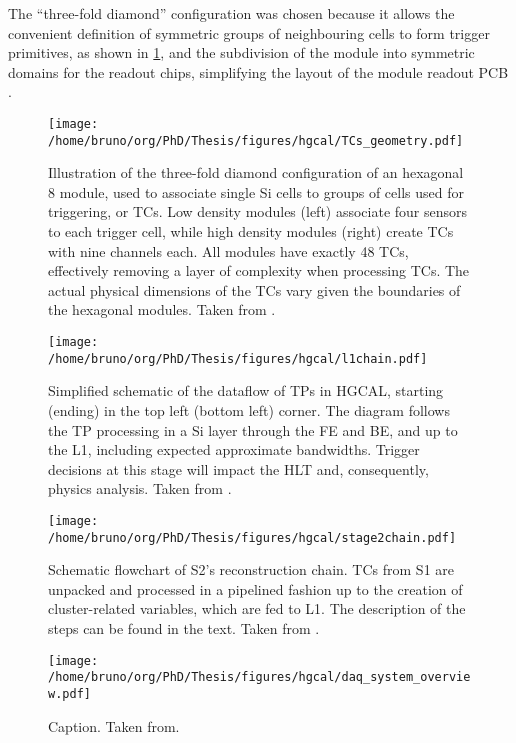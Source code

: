 \documentclass[11pt]{article}
\begin{document}
The ``three-fold diamond'' configuration was chosen because it allows the convenient definition of symmetric groups of neighbouring cells to form trigger primitives, as shown in \cref{fig:tcs_geometry}, and the subdivision of the module into symmetric domains for the readout chips, simplifying the layout of the module readout \ac{PCB} \cite{l1TDR}.

\begin{figure}
\texttt{[image: /home/bruno/org/PhD/Thesis/figures/hgcal/TCs\_geometry.pdf]}
\caption{\label{fig:tcs_geometry}Illustration of the three-fold diamond configuration of an hexagonal \SI{8}{\inch} module, used to associate single \ac{Si} cells to groups of cells used for triggering, or \acp{TC}. Low density modules (left) associate four sensors to each trigger cell, while high density modules (right) create \acp{TC} with nine channels each. All modules have exactly \num{48} \acp{TC}, effectively removing a layer of complexity when processing \acp{TC}. The actual physical dimensions of the \acp{TC} vary given the boundaries of the hexagonal modules. Taken from \cite{hgcalTDR}.}
\end{figure}

\begin{figure}
\begin{center}
\texttt{[image: /home/bruno/org/PhD/Thesis/figures/hgcal/l1chain.pdf]}
\end{center}
\caption{\label{fig:l1chain}Simplified schematic of the dataflow of \acp{TP} in HGCAL, starting (ending) in the top left  (bottom left) corner. The diagram follows the \ac{TP} processing in a Si layer through the \ac{FE} and \ac{BE}, and up to the \ac{L1}, including expected approximate bandwidths. Trigger decisions at this stage will impact the \ac{HLT} and, consequently, physics analysis. Taken from \cite{bruno_chep23}.}
\end{figure}

\begin{figure}
\texttt{[image: /home/bruno/org/PhD/Thesis/figures/hgcal/stage2chain.pdf]}
\caption{\label{fig:stage2chain}Schematic flowchart of S2’s reconstruction chain. TCs from S1 are unpacked and processed in a pipelined fashion up to the creation of cluster-related variables, which are fed to L1. The description of the steps can be found in the text. Taken from \cite{bruno_chep23}.}
\end{figure}

\begin{figure}
\begin{center}
\texttt{[image: /home/bruno/org/PhD/Thesis/figures/hgcal/daq\_system\_overview.pdf]}
\end{center}
\caption{\label{fig:daq_system_overview}Caption. Taken from.}
\end{figure}
\end{document}
